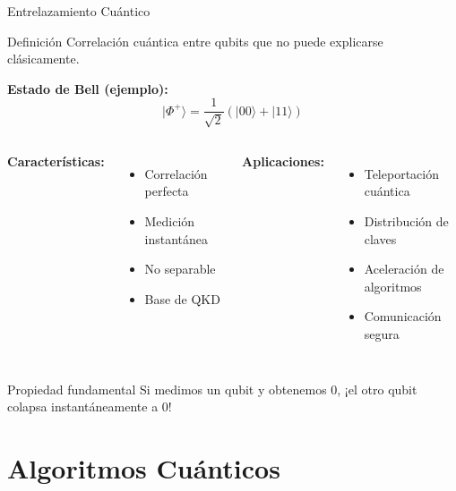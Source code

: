 \documentclass[aspectratio=169]{beamer}
\begin{document}
\begin{frame}{Entrelazamiento Cuántico}
\begin{block}{Definición}
Correlación cuántica entre qubits que no puede explicarse clásicamente.
\end{block}

\textbf{Estado de Bell (ejemplo):}
\[
|\Phi^+\rangle = \frac{1}{\sqrt{2}}(|00\rangle + |11\rangle)
\]

\vspace{0.1cm}
\begin{columns}[c]
\textbf{Características:}
\begin{itemize}
\item Correlación perfecta
\item Medición instantánea
\item No separable
\item Base de QKD
\end{itemize}

\textbf{Aplicaciones:}
\begin{itemize}
\item Teleportación cuántica
\item Distribución de claves
\item Aceleración de algoritmos
\item Comunicación segura
\end{itemize}
\end{columns}

\begin{alertblock}{Propiedad fundamental}
Si medimos un qubit y obtenemos 0, ¡el otro qubit colapsa instantáneamente a 0!
\end{alertblock}
\end{frame}

\section{Algoritmos Cuánticos}
\end{document}
